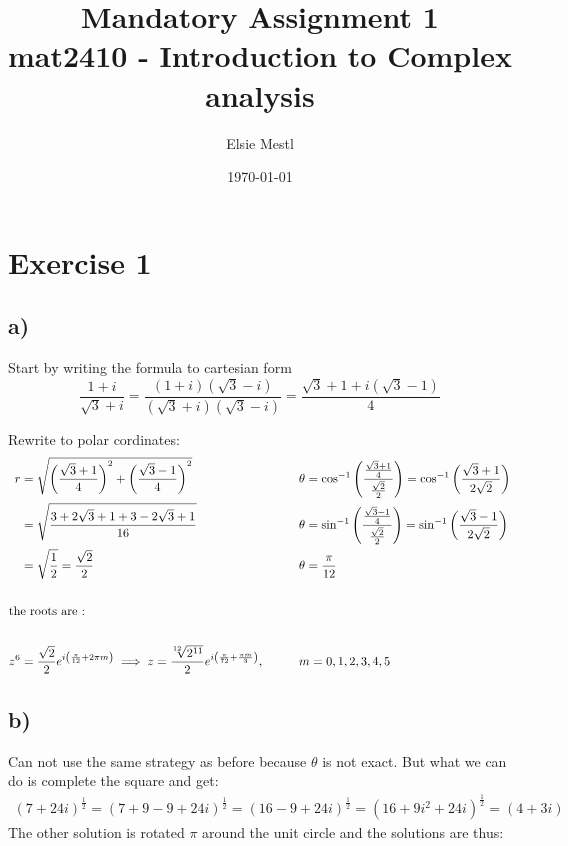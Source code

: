 \documentclass{article}
\author{Elsie Mestl}
\date{\today}
\title{Mandatory Assignment 1 \\ mat2410 - Introduction to Complex analysis}
\begin{document}
\maketitle


\section*{Exercise 1}
\subsection*{a)}

Start by writing the formula to cartesian form
\[
\frac{1+ i}{\sqrt{3}+i} = \frac{(1+ i)(\sqrt{3}-i)}{(\sqrt{3}+i)(\sqrt{3}-i)} = \frac{\sqrt{3}+1 + i(\sqrt{3} -1)}{4}
\]

Rewrite to polar cordinates:
\begin{align*}
  r &= \sqrt{\left(\frac{\sqrt{3}+1}{4}\right)^2 + \left(\frac{\sqrt{3}-1}{4}\right)^2}
  &&\theta = \cos^{-1}\left(\frac{\frac{\sqrt{3}+1}{4}}{\frac{\sqrt{2}}{2}} \right)  = \cos^{-1}\left(\frac{\sqrt{3} +1}{2\sqrt{2}}\right)\\
  &= \sqrt{\frac{3 + 2\sqrt{3} + 1 + 3 -2\sqrt{3} +1}{16}}
  &&\theta = \sin^{-1}\left(\frac{\frac{\sqrt{3}-1}{4}}{\frac{\sqrt{2}}{2}} \right)  = \sin^{-1}\left(\frac{\sqrt{3} -1}{2\sqrt{2}}\right)
  \\
  &= \sqrt{\frac{1}{2}} = \frac{\sqrt{2}}{2}
  &&\theta = \frac{\pi}{12} \\
  \ \\
  \intertext{the roots are
  :} \\
  z^6 &= \frac{\sqrt{2}}{2}e^{i\left(\frac{\pi}{12} + 2\pi m\right)}  \implies z= \frac{\sqrt[\leftroot{3}12]{2^{11}}}{2}e^{i\left(\frac{\pi}{72} + \frac{\pi m}{3}\right)}, \qquad &&m = 0,1,2,3,4,5
\end{align*}


\subsection*{b)}
Can not use the same strategy as before because $\theta$ is not exact.
But what we can do is complete the square and get:
\begin{align*}
  \left(7 + 24i\right)^{\frac{1}{2}} = \left(7 + 9 -9 + 24i\right)^{\frac{1}{2}} =  \left(16 - 9 + 24i\right)^{\frac{1}{2}} =  \left(16  +9i^2 + 24i\right)^{\frac{1}{2}}= \left(4 + 3i\right)
\end{align*}
The other solution is rotated $\pi$ around the unit circle and the solutions are thus:
\end{document}
